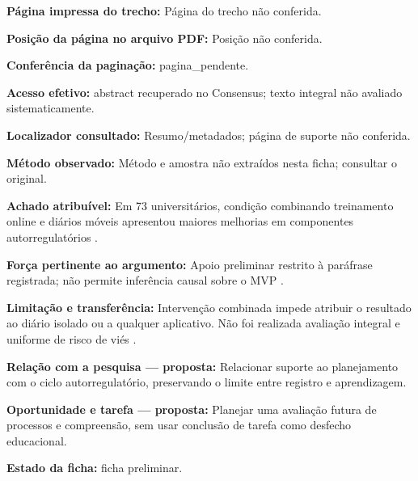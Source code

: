 \noindent\textbf{Página impressa do trecho:} Página do trecho não conferida.\par\medskip

\noindent\textbf{Posição da página no arquivo PDF:} Posição não conferida.\par\medskip

\noindent\textbf{Conferência da paginação:} pagina\_pendente.\par\medskip

\noindent\textbf{Acesso efetivo:} abstract recuperado no Consensus; texto integral não avaliado sistematicamente.\par\medskip

\noindent\textbf{Localizador consultado:} Resumo/metadados; página de suporte não conferida.\par\medskip

\noindent\textbf{Método observado:} Método e amostra não extraídos nesta ficha; consultar o original.\par\medskip

\noindent\textbf{Achado atribuível:} Em 73 universitários, condição combinando treinamento online e diários móveis apresentou maiores melhorias em componentes autorregulatórios \citep{education_broadbent2020}.\par\medskip

\noindent\textbf{Força pertinente ao argumento:} Apoio preliminar restrito à paráfrase registrada; não permite inferência causal sobre o MVP \citep{education_broadbent2020}.\par\medskip

\noindent\textbf{Limitação e transferência:} Intervenção combinada impede atribuir o resultado ao diário isolado ou a qualquer aplicativo. Não foi realizada avaliação integral e uniforme de risco de viés \citep{education_broadbent2020}.\par\medskip

\noindent\textbf{Relação com a pesquisa — proposta:} Relacionar suporte ao planejamento com o ciclo autorregulatório, preservando o limite entre registro e aprendizagem.\par\medskip

\noindent\textbf{Oportunidade e tarefa — proposta:} Planejar uma avaliação futura de processos e compreensão, sem usar conclusão de tarefa como desfecho educacional.\par\medskip

\noindent\textbf{Estado da ficha:} ficha preliminar.\par\medskip

